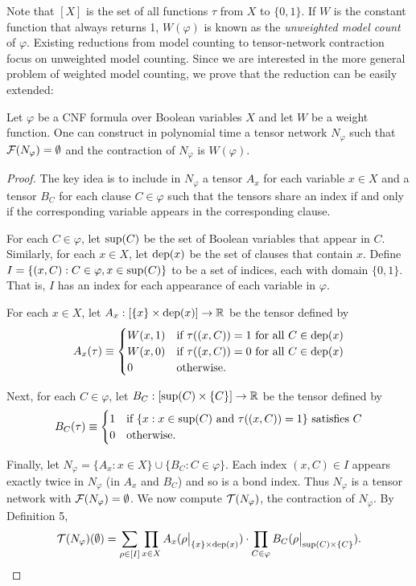 Note that $[X]$ is the set of all functions $\tau$ from $X$ to $\{0, 1\}$. If $W$ is the constant function that always returns 1, $W(\varphi)$ is known as the \emph{unweighted model count} of $\varphi$. Existing reductions from model counting to tensor-network contraction \cite{BMT15,KCMR18} focus on unweighted model counting. Since we are interested in the more general problem of weighted model counting, we prove that the reduction can be easily extended:
\begin{theorem}
\label{thm:wmc-reduction}
Let $\varphi$ be a CNF formula over Boolean variables $X$ and let $W$ be a weight function. One can construct in polynomial time a tensor network $N_\varphi$ such that $\mathcal{F}(N_\varphi) = \emptyset$ and the contraction of $N_\varphi$ is $W(\varphi)$.
\end{theorem}
\begin{proof}
The key idea is to include in $N_\varphi$ a tensor $A_x$ for each variable $x \in X$ and a tensor $B_C$ for each clause $C \in \varphi$ such that the tensors share an index if and only if the corresponding variable appears in the corresponding clause.

For each $C \in \varphi$, let $\text{sup}(C)$ be the set of Boolean variables that appear in $C$. Similarly, for each $x \in X$, let $\text{dep}(x)$ be the set of clauses that contain $x$. Define $I = \{(x, C) : C \in \varphi, x \in \text{sup}(C)\}$ to be a set of indices, each with domain $\{0, 1\}$. That is, $I$ has an index for each appearance of each variable in $\varphi$.

For each $x \in X$, let $A_x: [\{x\} \times \text{dep}(x)] \rightarrow \mathbb{R}$ be the tensor defined by $$A_x(\tau) \equiv \begin{cases}W(x, 1)&\text{if}~\tau((x,C)) = 1~\text{for all}~C \in \text{dep}(x)\\W(x, 0)&\text{if}~\tau((x,C)) = 0~\text{for all}~C \in \text{dep}(x)\\0&\text{otherwise.}\end{cases}$$

Next, for each $C \in \varphi$, let $B_C: [\text{sup}(C) \times \{C\}] \rightarrow \mathbb{R}$ be the tensor defined by
$$B_C(\tau) \equiv \begin{cases}1& \text{if}~\{x: x \in \text{sup}(C)~\text{and}~\tau((x, C)) = 1\}~\text{satisfies}~C\\0&\text{otherwise.}\end{cases}$$

Finally, let $N_\varphi = \{ A_x : x \in X\} \cup \{B_C : C \in \varphi\}$. Each index $(x, C) \in I$ appears exactly twice in $N_\varphi$ (in $A_x$ and $B_C$) and so is a bond index. Thus $N_\varphi$ is a tensor network with $\mathcal{F}(N_\varphi) = \emptyset$. We now compute $\mathcal{T}(N_\varphi)$, the contraction of $N_\varphi$. By Definition 5,
$$\mathcal{T}(N_\varphi)(\emptyset) = \sum_{\rho \in [I]} \prod_{x \in X} A_x(\rho\big|_{\{x\} \times \text{dep}(x)}) \cdot \prod_{C \in \varphi} B_C(\rho\big|_{\text{sup}(C) \times \{C\}}).$$


\end{proof}
